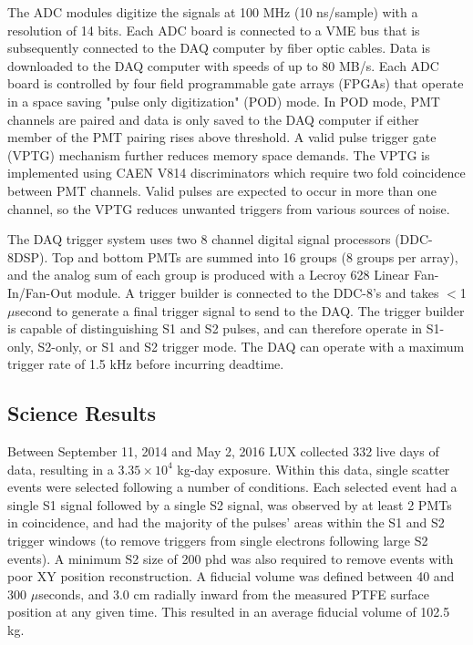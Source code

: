 The ADC modules digitize the signals at 100 MHz (10 ns/sample) with a resolution of 14 bits. Each ADC board is connected to a VME bus that is subsequently connected to the DAQ computer by fiber optic cables.  Data is downloaded to the DAQ computer with speeds of up to 80 MB/s.  Each ADC board is controlled by four field programmable gate arrays (FPGAs) that operate in a space saving "pulse only digitization" (POD) mode. In POD mode, PMT channels are paired and data is only saved to the DAQ computer if either member of the PMT pairing rises above threshold. A valid pulse trigger gate (VPTG) mechanism further reduces memory space demands.  The VPTG is implemented using CAEN V814 discriminators which require two fold coincidence between PMT channels. Valid pulses are expected to occur in more than one channel, so the VPTG reduces unwanted triggers from various sources of noise.

The DAQ trigger system uses two 8 channel digital signal processors (DDC-8DSP).  
Top and bottom PMTs are summed into 16 groups (8 groups per array), and the analog sum of each group is produced with a Lecroy 628 Linear Fan-In/Fan-Out module.  
A trigger builder is connected to the DDC-8’s and takes $<$1 $\mu$second to generate a final trigger signal to send to the DAQ.  The trigger builder is capable of distinguishing S1 and S2 pulses, and can therefore operate in S1-only, S2-only, or S1 and S2 trigger mode.  The DAQ can operate with a maximum trigger rate of 1.5 kHz before incurring deadtime. 

\subsection{Science Results}

Between September 11, 2014  and May 2, 2016 LUX collected 332 live days of data, resulting in a $3.35 \times 10^4$ kg-day exposure.  Within this data, single scatter events were selected following a number of conditions.  Each selected event had a single S1 signal followed by a single S2 signal, was observed by at least 2 PMTs in coincidence, and had the majority of the pulses' areas within the S1 and S2 trigger windows (to remove triggers from single electrons following large S2 events).  A minimum S2 size of 200 phd was also required to remove events with poor XY position reconstruction.  A fiducial volume was defined between 40 and 300 $\mu$seconds, and 3.0 cm radially inward from the measured PTFE surface position at any given time.  This resulted in an average fiducial volume of 102.5 kg.

